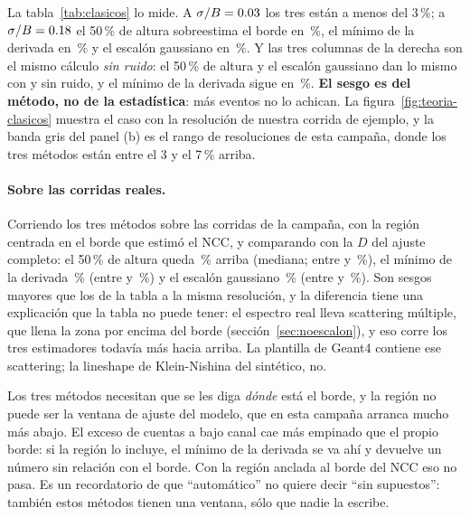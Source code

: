 \documentclass[11pt,a4paper]{article}
\begin{document}
La tabla~\ref{tab:clasicos} lo mide. A $\sigma/B = 0.03$ los tres
están a menos del 3\,\%; a $\sigma/B = 0.18$ el 50\,\% de altura
sobreestima el borde en \ClasMitadHi\,\%, el mínimo de la derivada en
\ClasDifHi\,\% y el escalón gaussiano en \ClasGaussHi\,\%. Y las tres
columnas de la derecha son el mismo cálculo \emph{sin ruido}: el 50\,\% de
altura y el escalón gaussiano dan lo mismo con y sin ruido, y el mínimo de la
derivada sigue en \ClasDifSinHi\,\%. \textbf{El sesgo es del método, no de la
estadística}: más eventos no lo achican. La figura~\ref{fig:teoria-clasicos}
muestra el caso con la resolución de nuestra corrida de ejemplo, y la banda
gris del panel (b) es el rango de resoluciones de esta campaña, donde los tres
métodos están entre el 3 y el 7\,\% arriba.

\paragraph{Sobre las corridas reales.} Corriendo los tres métodos sobre las
\ClasNReales{} corridas de la campaña, con la región centrada en el borde que
estimó el NCC, y comparando con la $D$ del ajuste completo: el 50\,\% de
altura queda \ClasRealMitadMed\,\% arriba (mediana; entre \ClasRealMitadMin{}
y \ClasRealMitadMax\,\%), el mínimo de la derivada \ClasRealDifMed\,\% (entre
\ClasRealDifMin{} y \ClasRealDifMax\,\%) y el escalón gaussiano
\ClasRealGaussMed\,\% (entre \ClasRealGaussMin{} y \ClasRealGaussMax\,\%). Son
sesgos mayores que los de la tabla a la misma resolución, y la diferencia
tiene una explicación que la tabla no puede tener: el espectro real lleva
scattering múltiple, que llena la zona por encima del borde
(sección~\ref{sec:noescalon}), y eso corre los tres estimadores todavía más hacia arriba. La
plantilla de Geant4 contiene ese scattering; la lineshape de Klein-Nishina
del sintético, no.

\begin{aviso}
Los tres métodos necesitan que se les diga \emph{dónde} está el borde, y la
región no puede ser la ventana de ajuste del modelo, que en esta campaña
arranca mucho más abajo. El exceso de cuentas a bajo canal cae más
empinado que el propio borde: si la región lo incluye, el mínimo de la
derivada se va ahí y devuelve un número sin relación con el borde. Con la
región anclada al borde del NCC eso no pasa. Es un recordatorio de que
``automático'' no quiere decir ``sin supuestos'': también estos métodos
tienen una ventana, sólo que nadie la escribe.
\end{aviso}
\end{document}
